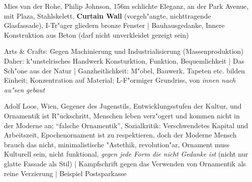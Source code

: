 \documentclass[a5paper]{scrartcl}
\begin{document}
\begin{description}[leftmargin=!,labelwidth=\widthof{\bfseries P1}]
  \item[Seagrambuilding] Mies van der Rohe, Philip Johnson, 156m schlichte Eleganz, an der Park Avenue, mit Plaza, Stahlskelett, \textbf{Curtain Wall} (vorgeh"angte, nichttragende Glasfassade), I-Tr"ager gliedern bronze Fenster | Bauhausgedanke, Innere Konstruktion aus Beton (darf nicht unverkleidet gezeigt sein)
  \item[Red House] Arts \& Crafts: Gegen Machinierung und Industrialisierung (Massenproduktion) Daher: k"unstelrisches Handwerk Konsturktion, Funktion, Bequemlichkeit | Das Sch"one aus der Natur | Ganzheitlichkeit: M"obel, Bauwerk, Tapeten etc. bilden Einheit; Konzentration auf Material; L-F"ormiger Grundriss, von \emph{innen nach au"sen gebaut}
  \item[Ornament und Verbrechen] Adolf Loos, Wien, Gegener des Jugenstils, Entwicklungsstufen der Kultur, und Ornamentik ist R"uckschritt, Menschen leben verz"ogert und kommen nicht in der Moderne an; "`falsche Ornamentik"', Sozialkritik: Verschwendetes Kapital und Arbeitszeit, Epochenornament ist zu respektieren, doch der Moderne Mensch brauch das nicht, minimalistische "Astethik, revolution"ar, Ornament muss Kulturell sein, nicht funktional, \emph{gegen jede Form die nicht Gedanke ist} (nicht nur glatte Fassade als Stil) | Kampfschrift gegen das Verwenden von Ornamentik als reine Verzierung | Beispiel Postsparkasse


\end{description}
\end{document}

